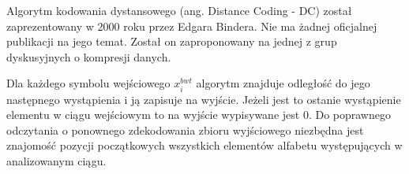 
Algorytm kodowania dystansowego (ang. Distance Coding - DC)\cite{deorowicz} został zaprezentowany w 2000 roku przez Edgara Bindera. Nie ma żadnej oficjalnej publikacji na jego temat. Został on zaproponowany na jednej z grup dyskusyjnych o kompresji danych. 

Dla każdego symbolu wejściowego $x_i^{bwt}$ algorytm znajduje odległość do jego następnego wystąpienia i ją zapisuje na wyjście. Jeżeli jest to ostanie wystąpienie elementu w ciągu wejściowym to na wyjście wypisywane jest $0$. Do poprawnego odczytania o ponownego zdekodowania zbioru wyjściowego niezbędna jest znajomość pozycji początkowych wszystkich elementów alfabetu występujących w analizowanym ciągu.